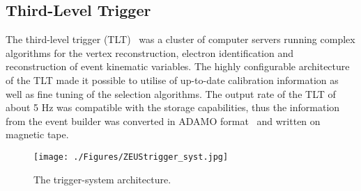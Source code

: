 \subsection{Third-Level Trigger}
\label{subsec:tlt}
The third-level trigger (TLT)~\cite{Bailey:1992iq,Bhadra:1989kz} was a cluster of computer servers running complex algorithms for the vertex reconstruction, electron identification and reconstruction of event kinematic variables. The highly configurable architecture of the TLT made it possible to utilise of up-to-date calibration information as well as fine tuning of the selection algorithms. The output rate of the TLT of about 5 Hz was compatible with the storage capabilities, thus the information from the event builder was converted in ADAMO format~\cite{Hart:1990dz} and written on magnetic tape.

\begin{figure}[h]
	\centering
		\texttt{[image: ./Figures/ZEUStrigger\_syst.jpg]}
	\caption{The \zeus trigger-system architecture.}
	\label{fig:trigarch}
\end{figure}
\newpage
